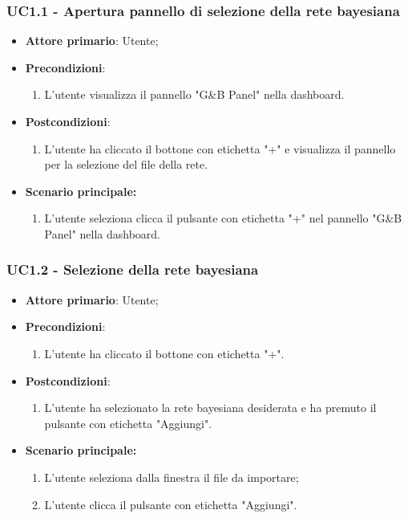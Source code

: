 \subsubsection{UC1.1 - Apertura pannello di selezione della rete bayesiana}\label{UC1.1}
\begin{itemize}
	\item \textbf{Attore primario}: Utente;
	\item \textbf{Precondizioni}:
	\begin{enumerate}
		\item L'utente visualizza il pannello "G\&B Panel" nella dashboard.
	\end{enumerate}
	\item \textbf{Postcondizioni}: 
	\begin{enumerate}
		\item L'utente ha cliccato il bottone con etichetta "+" e visualizza il pannello per la selezione del file della rete.
	\end{enumerate}
	\item \textbf{Scenario principale:}
	\begin{enumerate}
		\item L'utente seleziona clicca il pulsante con etichetta "+" nel pannello "G\&B Panel" nella dashboard.
	\end{enumerate}
\end{itemize}


\subsubsection{UC1.2 - Selezione della rete bayesiana}\label{UC1.2}
\begin{itemize}
	\item \textbf{Attore primario}: Utente;
	\item \textbf{Precondizioni}:
	\begin{enumerate}
		\item L'utente ha cliccato il bottone con etichetta "+".
	\end{enumerate}
	\item \textbf{Postcondizioni}: 
	\begin{enumerate}
		\item L'utente ha selezionato la rete bayesiana desiderata e ha premuto il pulsante con etichetta "Aggiungi".
	\end{enumerate}
	\item \textbf{Scenario principale:}
	\begin{enumerate}
		\item L'utente seleziona dalla finestra il file da importare;
		\item L'utente clicca il pulsante con etichetta "Aggiungi".
	\end{enumerate}
\end{itemize}

